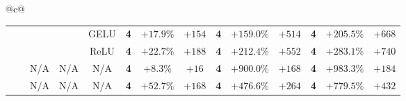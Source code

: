 \begin{tabular}{@{}c@{}}
\begin{tabular}{@{}ccccc|ccccccccc@{}}
\hdashline[1pt/3pt]
\cmark & \cmark & \cmark & \cmark & GELU & \textbf{4} & \textcolor{green!55!black}{$+17.9\%$} & \textcolor{green!55!black}{$+154$} & \textbf{4} & \textcolor{green!55!black}{$+159.0\%$} & \textcolor{green!55!black}{$+514$} & \textbf{4} & \textcolor{green!55!black}{$+205.5\%$} & \textcolor{green!55!black}{$+668$} \\
\cmark & \cmark & \cmark & \cmark & ReLU & \textbf{4} & \textcolor{green!55!black}{$+22.7\%$} & \textcolor{green!55!black}{$+188$} & \textbf{4} & \textcolor{green!55!black}{$+212.4\%$} & \textcolor{green!55!black}{$+552$} & \textbf{4} & \textcolor{green!55!black}{$+283.1\%$} & \textcolor{green!55!black}{$+740$} \\
\midrule
\xmark & \xmark & N/A & N/A & N/A & \textbf{4} & \textcolor{green!55!black}{$+8.3\%$} & \textcolor{green!55!black}{$+16$} & \textbf{4} & \textcolor{green!55!black}{$+900.0\%$} & \textcolor{green!55!black}{$+168$} & \textbf{4} & \textcolor{green!55!black}{$+983.3\%$} & \textcolor{green!55!black}{$+184$} \\
\cmark & \xmark & N/A & N/A & N/A & \textbf{4} & \textcolor{green!55!black}{$+52.7\%$} & \textcolor{green!55!black}{$+168$} & \textbf{4} & \textcolor{green!55!black}{$+476.6\%$} & \textcolor{green!55!black}{$+264$} & \textbf{4} & \textcolor{green!55!black}{$+779.5\%$} & \textcolor{green!55!black}{$+432$} \\
\bottomrule
\end{tabular}
\end{tabular}
